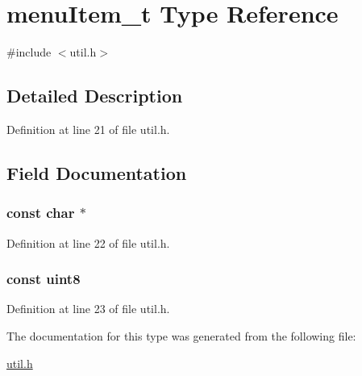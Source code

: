 \hypertarget{typemenu_item__t}{
\section{menuItem\_\-t Type Reference}
\label{typemenu_item__t}
}


{\ttfamily \#include $<$util.h$>$}

\par
\par


\subsection{Detailed Description}


Definition at line 21 of file util.h.



\subsection{Field Documentation}
\hypertarget{typemenu_item__t_a6bfba63f5d1c1dfef98982c69f4d2b24}{
\subsubsection[{szDescr}]{ {\bfseries const char $\ast$ } }}
\label{typemenu_item__t_a6bfba63f5d1c1dfef98982c69f4d2b24}


Definition at line 22 of file util.h.

\hypertarget{typemenu_item__t_a8a0f8f3ed471e0b88a0b2977f9e63ff2}{
\subsubsection[{value}]{ {\bfseries const uint8 } }}
\label{typemenu_item__t_a8a0f8f3ed471e0b88a0b2977f9e63ff2}


Definition at line 23 of file util.h.



The documentation for this type was generated from the following file:\begin{DoxyCompactItemize}
\item 
\hyperlink{util_8h}{util.h}\end{DoxyCompactItemize}
